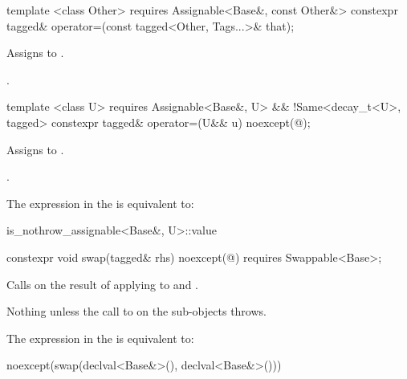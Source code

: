 \begin{itemdecl}
template <class Other>
  requires Assignable<Base&, const Other&>
constexpr tagged& operator=(const tagged<Other, Tags...>& that);
\end{itemdecl}

\begin{itemdescr}
\pnum
\effects Assigns  to .

\pnum
\returns {}.
\end{itemdescr}

\begin{itemdecl}
template <class U>
  requires Assignable<Base&, U> && !Same<decay_t<U>, tagged>
constexpr tagged& operator=(U&& u) noexcept(@\seebelow@);
\end{itemdecl}

\begin{itemdescr}
\pnum
\effects Assigns  to .

\pnum
\returns {}.

\pnum
\remarks The expression in the  is equivalent to:

\begin{codeblock}
is_nothrow_assignable<Base&, U>::value
\end{codeblock}
\end{itemdescr}

\begin{itemdecl}
constexpr void swap(tagged& rhs) noexcept(@\seebelow@)
  requires Swappable<Base>;
\end{itemdecl}

\begin{itemdescr}
\pnum
\effects Calls  on the result of applying  to  and
.

\pnum
\throws Nothing unless the call to  on the  sub-objects throws.

\pnum
\remarks The expression in the  is equivalent to:

\begin{codeblock}
noexcept(swap(declval<Base&>(), declval<Base&>()))
\end{codeblock}
\end{itemdescr}

